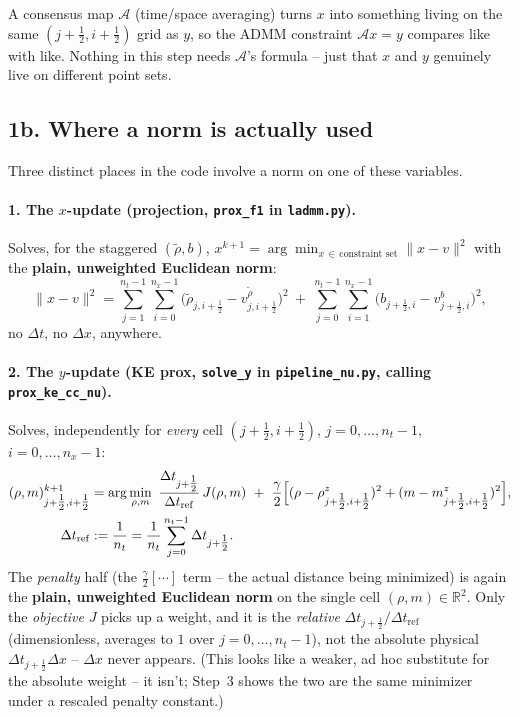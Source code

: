\documentclass[11pt]{article}
\newcommand{\dt}{\Delta t}
\newcommand{\dx}{\Delta x}
\newcommand{\RR}{\mathbb{R}}
\newcommand{\code}[1]{\texttt{#1}}
\newcommand{\half}{\tfrac12}
\begin{document}
A consensus map $\mathcal{A}$ (time/space averaging) turns $x$ into something living on the same
$(j+\half,i+\half)$ grid as $y$, so the ADMM constraint $\mathcal{A}x=y$ compares like with like.
Nothing in this step needs $\mathcal{A}$'s formula -- just that $x$ and $y$ genuinely live on
different point sets.

\subsection*{1b. Where a norm is actually used}

Three distinct places in the code involve a norm on one of these variables.

\paragraph{1. The $x$-update (projection, \code{prox\_f1} in \code{ladmm.py}).} Solves, for the
staggered $(\tilde\rho,b)$, $x^{k+1}=\arg\min_{x\,\in\,\text{constraint set}}\|x-v\|^2$ with the
\textbf{plain, unweighted Euclidean norm}:
\[
  \|x-v\|^2 = \sum_{j=1}^{n_t-1}\sum_{i=0}^{n_x-1}
  \bigl(\tilde\rho_{j,i+\half}-v^{\tilde\rho}_{j,i+\half}\bigr)^2
  \ + \
  \sum_{j=0}^{n_t-1}\sum_{i=1}^{n_x-1}
  \bigl(b_{j+\half,i}-v^{b}_{j+\half,i}\bigr)^2,
\]
no $\dt$, no $\dx$, anywhere.

\paragraph{2. The $y$-update (KE prox, \code{solve\_y} in \code{pipeline\_nu.py}, calling
\code{prox\_ke\_cc\_nu}).} Solves, independently for \emph{every} cell $(j+\half,i+\half)$,
$j=0,\dots,n_t-1$, $i=0,\dots,n_x-1$:
\begin{align*}
  (\rho,m)^{k+1}_{j+\half,i+\half} &= \arg\min_{\rho,m}\ \frac{\dt_{j+\half}}{\dt_\mathrm{ref}}\,J(\rho,m)
  \ + \ \frac{\gamma}{2}\Bigl[(\rho-\rho^z_{j+\half,i+\half})^2 + (m-m^z_{j+\half,i+\half})^2\Bigr], \\
  \dt_\mathrm{ref} &:= \frac1{n_t} = \frac1{n_t}\sum_{j=0}^{n_t-1}\dt_{j+\half}.
\end{align*}
The \emph{penalty} half (the $\frac{\gamma}{2}[\cdots]$ term -- the actual distance being
minimized) is again the \textbf{plain, unweighted Euclidean norm} on the single cell
$(\rho,m)\in\RR^2$. Only the \emph{objective} $J$ picks up a weight, and it is the
\emph{relative} $\dt_{j+\half}/\dt_\mathrm{ref}$ (dimensionless, averages to $1$ over
$j=0,\dots,n_t-1$), not the absolute physical $\dt_{j+\half}\dx$ -- $\dx$ never appears.
(This looks like a weaker, ad hoc substitute for the absolute weight -- it isn't; Step~3
shows the two are the same minimizer under a rescaled penalty constant.)
\end{document}
